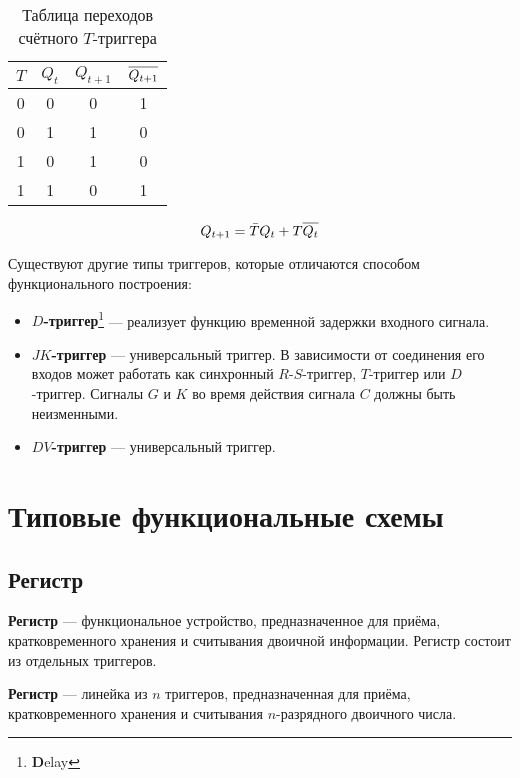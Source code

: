\documentclass[10pt,a4paper,titlepage]{article}
\begin{document}
\begin{longtable}{|c|c|c|c|}
\caption{Таблица переходов счётного $T$-триггера}\\
\hline
$T$	&	$Q_t$	&	$Q_{t+1}$	&	$\overline{\mathstrut Q_{t+1}}$\\
\hline
0	&	0	&	0	&	1\\
0	&	1	&	1	&	0\\
1	&	0	&	1	&	0\\
1	&	1	&	0	&	1\\
\hline
\end{longtable}

\[Q_{t+1}=\bar{T}Q_t+T\overline{\mathstrut Q_t}\]

Существуют другие типы триггеров, которые отличаются способом функционального построения:
\begin{itemize}
\item \textbf{$D$-триггер}\footnote{\textbf{D}elay} --- реализует функцию временной задержки входного сигнала.
\item \textbf{$JK$-триггер} --- универсальный триггер.
В зависимости от соединения его входов может работать как синхронный $R$-$S$-триггер, $T$-триггер или $D$-триггер.
Сигналы $G$ и $K$ во время действия сигнала $C$ должны быть неизменными.
\item \textbf{$DV$-триггер} --- универсальный триггер.
\end{itemize}

\newpage
\section{Типовые функциональные схемы}
\subsection{Регистр}
\textbf{Регистр} --- функциональное устройство, предназначенное для приёма, кратковременного хранения и считывания двоичной информации.
Регистр состоит из отдельных триггеров.

\textbf{Регистр} --- линейка из $n$ триггеров, предназначенная для приёма, кратковременного хранения и считывания $n$-разрядного двоичного числа.
\end{document}

